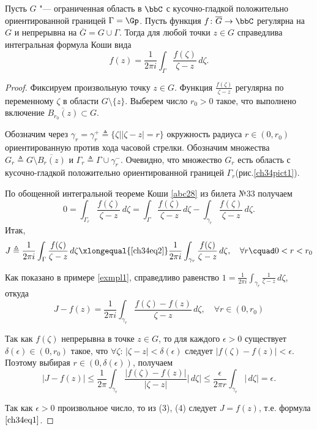 \begin{thm} \label{ch34thm1}
Пусть $G$ "--- ограниченная область в $\bbC$ с кусочно-гладкой положительно ориентированной границей $\Gamma= \Gp$. Пусть функция $f\colon \overline{G}\to \bbC$ регулярна на $G$ и непрерывна на $\overline{G}=G\cup\Gamma$. Тогда для любой точки $z\in G$ справедлива интегральная формула Коши вида
 \begin{equation} \label{ch34eq1}
 f(z) = \frac{1}{2\pi i}\int_\Gamma \frac{f(\zeta)}{\zeta - z}\,d\zeta.
 \end{equation}
\end{thm}
\begin{proof}
Фиксируем произвольную точку $z \in G$. Функция $\frac{f(\zeta)}{\zeta - z}$ регулярна по переменному $\zeta$ в области $G \setminus \{z\}$. Выберем число $r_0 > 0$ такое, что выполнено включение $\overline{B_{r_0}(z)}\subset G$. 


Обозначим через $\gamma_r=\gamma_r^{+} \triangleq \{ \zeta \bigl| |\zeta - z| = r \}$ окружность радиуса $r \in (0, r_0)$ ориентированную против хода часовой стрелки. Обозначим множества $G_r \triangleq G \setminus \overline{B_r(z)}$ и $\Gamma_r \triangleq \Gamma \cup \gamma_r^{-}$. Очевидно, что множество $G_r$ есть область с кусочно-гладкой положительно ориентированной границей $\Gamma_r$(рис.\ref{ch34pict1}). 

По обощенной интегральной теореме Коши \ref{abc28} из билета №33 получаем
\begin{equation} \label{ch34eq2}
 0 = \int_{\Gamma_r} \frac{f(\zeta)}{\zeta - z}\,d\zeta = \int_\Gamma \frac{f(\zeta)}{\zeta - z}\,d\zeta - \int_{\gamma_r} \frac{f(\zeta)}{\zeta - z}\,d\zeta.
\end{equation}
Итак,
\begin{equation} \label{ch34eq3}
J \triangleq \frac{1}{2\pi i} \int_\Gamma \frac{f(\zeta)}{\zeta - z}\,d\zeta \xlongequal{\eqref{ch34eq2}} \frac{1}{2\pi i} \int_{\gamma_r} \frac{f(\zeta)}{\zeta - z}\,d\zeta,  \quad  \forall r\cquad 0 < r < r_0
\end{equation}

Как показано в примере \ref{exmpl1}, справедливо равенство $1 = \frac{1}{2\pi i} \int_{\gamma_r} \frac{1}{\zeta - z}\,d\zeta$, откуда 
$$
J - f(z) = \frac{1}{2\pi i} \int_{\gamma_r} \frac{f(\zeta) - f(z)}{\zeta - z}\,d\zeta, \quad  \forall r \in (0,r_0)
$$

Так как $f(\zeta)$ непрерывна в точке $z \in G$, то для каждого $\epsilon > 0$ существует $\delta(\epsilon) \in (0, r_0)$ такое, что $\forall \zeta$: $|\zeta - z| < \delta(\epsilon)$ следует $|f(\zeta) - f(z)| < \epsilon$. Поэтому выбирая $r \in (0, \delta(\epsilon))$, получаем
\begin{equation} \label{ch34eq4}
|J - f(z)| \le \frac{1}{2\pi} \int_{\gamma_r} \frac{|f(\zeta) - f(z)|}{|\zeta - z|}|\,d\zeta| \le 
\frac{\epsilon}{2 \pi r} \int_{\gamma_r} |\,d\zeta| = \epsilon.
\end{equation}

Так как $\epsilon > 0$ произвольное число, то из (3), (4) следует $J = f(z)$, т.е. формула $\eqref{ch34eq1}$.
\end{proof}

